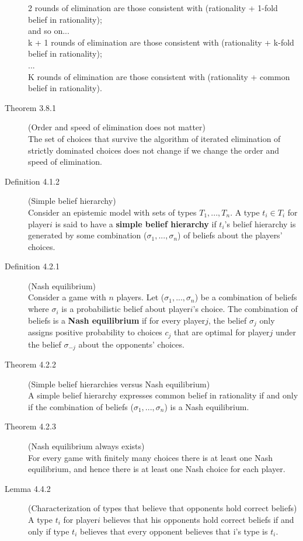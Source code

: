 \documentclass{article}
\begin{document}
\begin{description}
  2 rounds of elimination are those consistent with (rationality + 1-fold belief in rationality);\\
  and so on...\\
  k + 1 rounds of elimination are those consistent with (rationality + k-fold belief in rationality);\\
  ...\\
  K rounds of elimination are those consistent with (rationality + common belief in rationality).
  \item[Theorem 3.8.1] (Order and speed of elimination does not matter)\\
  The set of choices that survive the algorithm of iterated elimination of strictly dominated choices does not change if we change the order and speed of elimination.
  \item[Definition 4.1.2] (Simple belief hierarchy)\\
  Consider an epistemic model with sets of types $T_1,...,T_n$. A type $t_i \in T_i$ for player$i$ is said to have a {\bf simple belief hierarchy} if $t_i$'s belief hierarchy is generated by some combination ($\sigma_1,...,\sigma_n$) of beliefs about the players' choices.
  \item[Definition 4.2.1] (Nash equilibrium)\\
  Consider a game with $n$ players. Let ($\sigma_1,...,\sigma_n$) be a combination of beliefs where $\sigma_i$ is a probabilistic belief about player$i$'s choice. The combination of beliefs is a {\bf Nash equilibrium} if for every player$j$, the belief $\sigma_j$ only assigns positive probability to choices $c_j$ that are optimal for player$j$ under the belief $\sigma_{-j}$ about the opponents' choices.
  \item[Theorem 4.2.2] (Simple belief hierarchies versus Nash equilibrium)\\
  A simple belief hierarchy expresses common belief in rationality if and only if the combination of beliefs ($\sigma_1,...,\sigma_n$) is a Nash equilibrium.
  \item[Theorem 4.2.3] (Nash equilibrium always exists)\\
  For every game with finitely many choices there is at least one Nash equilibrium, and hence there is at least one Nash choice for each player.
  \item[Lemma 4.4.2] (Characterization of types that believe that opponents hold correct beliefs)\\
  A type $t_i$ for player$i$ believes that his opponents hold correct beliefs if and only if type $t_i$ believes that every opponent believes that i's type is $t_i$.

\end{description}
\end{document}
